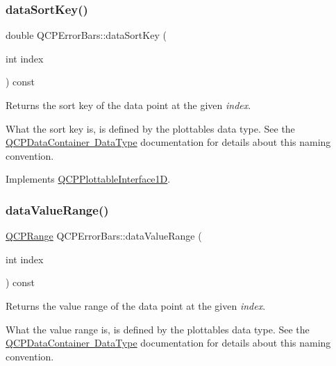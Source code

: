 \mbox{\label{class_q_c_p_error_bars_a3000a036124880a90c629d124c1cd1e2}} 
\subsubsection{\texorpdfstring{dataSortKey()}{dataSortKey()}}
{\footnotesize\ttfamily double Q\+C\+P\+Error\+Bars\+::data\+Sort\+Key (\begin{DoxyParamCaption}\item[{int}]{index }\end{DoxyParamCaption}) const\hspace{0.3cm}{\ttfamily [virtual]}}

Returns the sort key of the data point at the given {\itshape index}.

What the sort key is, is defined by the plottable\textquotesingle{}s data type. See the \mbox{\hyperlink{class_q_c_p_data_container_qcpdatacontainer-datatype}{Q\+C\+P\+Data\+Container Data\+Type}} documentation for details about this naming convention. 

Implements \mbox{\hyperlink{class_q_c_p_plottable_interface1_d_afdc92f9f01e7e35f2e96b2ea9dc14ae7}{Q\+C\+P\+Plottable\+Interface1D}}.

\mbox{\label{class_q_c_p_error_bars_af71af55d929d832daf32e283b21e1f3e}} 
\subsubsection{\texorpdfstring{dataValueRange()}{dataValueRange()}}
{\footnotesize\ttfamily \mbox{\hyperlink{class_q_c_p_range}{Q\+C\+P\+Range}} Q\+C\+P\+Error\+Bars\+::data\+Value\+Range (\begin{DoxyParamCaption}\item[{int}]{index }\end{DoxyParamCaption}) const\hspace{0.3cm}{\ttfamily [virtual]}}

Returns the value range of the data point at the given {\itshape index}.

What the value range is, is defined by the plottable\textquotesingle{}s data type. See the \mbox{\hyperlink{class_q_c_p_data_container_qcpdatacontainer-datatype}{Q\+C\+P\+Data\+Container Data\+Type}} documentation for details about this naming convention. 

